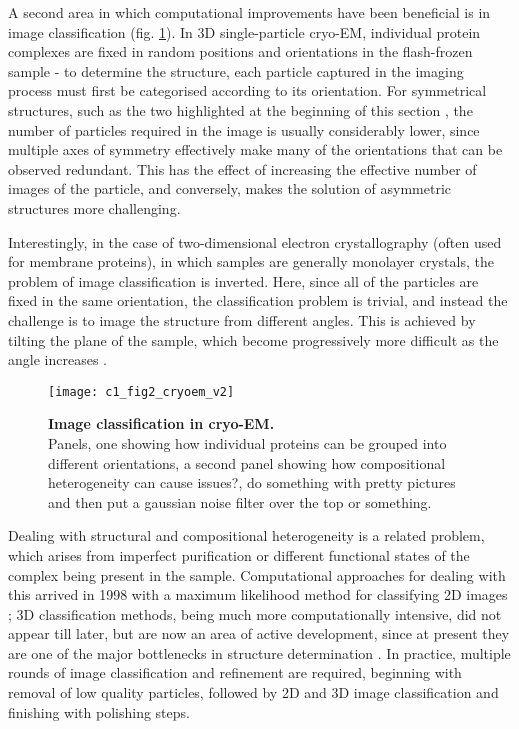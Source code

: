 \documentclass[a4paper,11pt,twoside,openright]{scrbook}
\begin{document}
A second area in which computational improvements have been beneficial is in image classification (fig. \ref{c1fig2}). In 3D single-particle cryo-EM, individual protein complexes are fixed in random positions and orientations in the flash-frozen sample - to determine the structure, each particle captured in the imaging process must first be categorised according to its orientation. For symmetrical structures, such as the two highlighted at the beginning of this section \cite{Merk2016}, the number of particles required in the image is usually considerably lower, since multiple axes of symmetry effectively make many of the orientations that can be observed redundant. This has the effect of increasing the effective number of images of the particle, and conversely, makes the solution of asymmetric structures more challenging.

Interestingly, in the case of two-dimensional electron crystallography (often used for membrane proteins), in which samples are generally monolayer crystals, the problem of image classification is inverted. Here, since all of the particles are fixed in the same orientation, the classification problem is trivial, and instead the challenge is to image the structure from different angles. This is achieved by tilting the plane of the sample, which become progressively more difficult as the angle increases \cite{Wisedchaisri2011}.

\clearpage

\begin{figure}
    \texttt{[image: c1\_fig2\_cryoem\_v2]}
    \caption[Image classification in cryo-EM]{\sffamily \textbf{Image classification in cryo-EM.} \\  Panels, one showing how individual proteins can be grouped into different orientations, a second panel showing how compositional heterogeneity can cause issues?, do something with pretty pictures and then put a gaussian noise filter over the top or something.}
    \label{c1fig2}
\end{figure}
\clearpage

Dealing with structural and compositional heterogeneity is a related problem, which arises from imperfect purification or different functional states of the complex being present in the sample. Computational approaches for dealing with this arrived in 1998 with a maximum likelihood method for classifying 2D images \cite{Sigworth1998}; 3D classification methods, being much more computationally intensive, did not appear till later, but are now an area of active development, since at present they are one of the major bottlenecks in structure determination \cite{Scheres2007,Lyumkis2013,Punjani2017}. In practice, multiple rounds of image classification and refinement are required, beginning with removal of low quality particles, followed by 2D and 3D image classification and finishing with polishing steps.
\end{document}
